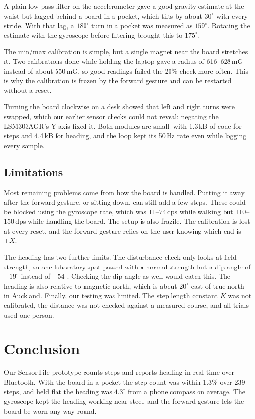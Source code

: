 \documentclass[conference,a4paper]{IEEEtran}
\begin{document}
A plain low-pass filter on the accelerometer gave a good gravity estimate at the waist but
lagged behind a board in a pocket, which tilts by about $30^\circ$ with every stride. With that
lag, a $180^\circ$ turn in a pocket was measured as $159^\circ$. Rotating the estimate with the
gyroscope before filtering brought this to $175^\circ$.

The min/max calibration is simple, but a single magnet near the board stretches it. Two
calibrations done while holding the laptop gave a radius of 616--628\,mG instead of about
550\,mG, so good readings failed the 20\% check more often. This is why the calibration is
frozen by the forward gesture and can be restarted without a reset.

Turning the board clockwise on a desk showed that left and right turns were swapped, which our
earlier sensor checks could not reveal; negating the LSM303AGR's Y axis fixed it. Both modules are small, with 1.3\,kB of code for steps
and 4.4\,kB for heading, and the loop kept its 50\,Hz rate even while logging every sample.

\subsection{Limitations}
Most remaining problems come from how the board is handled. Putting it away after the forward
gesture, or sitting down, can still add a few steps. These could be blocked using the gyroscope
rate, which was 11--74\,dps while walking but 110--150\,dps while handling the board. The setup
is also fragile. The calibration is lost at every reset, and the forward gesture relies on the
user knowing which end is $+X$.

The heading has two further limits. The disturbance check only looks at field strength, so one
laboratory spot passed with a normal strength but a dip angle of $-19^\circ$ instead of
$-54^\circ$. Checking the dip angle as well would catch this. The heading is also relative to
magnetic north, which is about $20^\circ$ east of true north in Auckland. Finally, our testing
was limited. The step length constant $K$ was not calibrated, the distance was not checked
against a measured course, and all trials used one person.

\section{Conclusion}
Our SensorTile prototype counts steps and reports heading in real time over Bluetooth. With the
board in a pocket the step count was within 1.3\% over 239 steps, and held flat the heading was
$4.3^\circ$ from a phone compass on average. The gyroscope kept the heading working near steel,
and the forward gesture lets the board be worn any way round.
\end{document}

